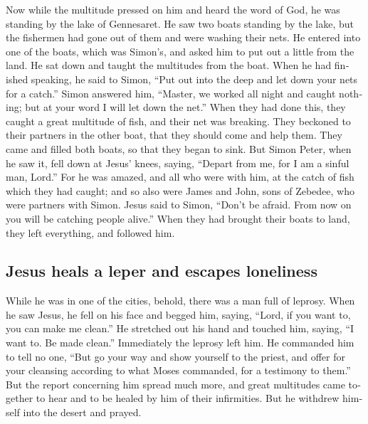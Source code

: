 \begin{paracol}{2}
\begin{otherlanguage}{english}
 Now while the multitude pressed on him and heard the word
of God, he was standing by the lake of Gennesaret.  He saw
two boats standing by the lake, but the fishermen had gone out of them
and were washing their nets.  He entered into one of the
boats, which was Simon's, and asked him to put out a little from the
land. He sat down and taught the multitudes from the boat.
 When he had finished speaking, he said to Simon, ``Put
out into the deep and let down your nets for a catch.'' 
Simon answered him, ``Master, we worked all night and caught nothing;
but at your word I will let down the net.''  When they had
done this, they caught a great multitude of fish, and their net was
breaking.  They beckoned to their partners in the other
boat, that they should come and help them. They came and filled both
boats, so that they began to sink.  But Simon Peter, when
he saw it, fell down at Jesus' knees, saying, ``Depart from me, for I am
a sinful man, Lord.''  For he was amazed, and all who were
with him, at the catch of fish which they had caught; 
and so also were James and John, sons of Zebedee, who were partners with
Simon. Jesus said to Simon, ``Don't be afraid. From now on you will be
catching people alive.''  When they had brought their
boats to land, they left everything, and followed him.

\hypertarget{jesus-heals-a-leper-and-escapes-loneliness}{%
\subsection{Jesus heals a leper and escapes
loneliness}\label{jesus-heals-a-leper-and-escapes-loneliness}}

 While he was in one of the cities, behold, there was a
man full of leprosy. When he saw Jesus, he fell on his face and begged
him, saying, ``Lord, if you want to, you can make me clean.''
 He stretched out his hand and touched him, saying, ``I
want to. Be made clean.'' Immediately the leprosy left him.
 He commanded him to tell no one, ``But go your way and
show yourself to the priest, and offer for your cleansing according to
what Moses commanded, for a testimony to them.''  But the
report concerning him spread much more, and great multitudes came
together to hear and to be healed by him of their infirmities.
 But he withdrew himself into the desert and prayed.


\end{otherlanguage}
\end{paracol}
